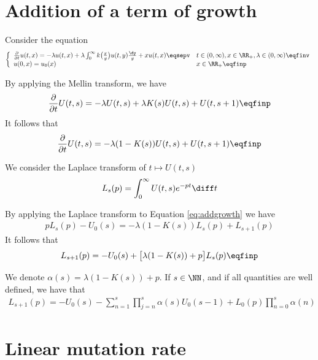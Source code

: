 \section{Addition of a term of growth}

Consider the equation
\begin{equation*}\left\{
    \begin{array}{ll}
	\frac{\partial}{\partial t}u(t,x) = - \lambda u(t,x) + \lambda \int_{0}^{\infty} k\big( \frac{x}{y}\big)u(t,y) \frac{\dy}{y} + xu(t,x)
	\eqsepv
	& t \in (0, \infty), x \in \RR_+, \lambda \in (0, \infty) \eqfinv
	\\
	u(0, x) = u_0(x)
	& x \in \RR_+
	\eqfinp
    \end{array}
	\right.
\end{equation*}

By applying the Mellin transform, we have
	\begin{equation*}
		\frac{\partial}{\partial t} U(t,s) = - \lambda U(t,s) + \lambda K(s) U(t,s) + U(t,s+1)
		\eqfinp
	\end{equation*}
It follows that
    \begin{equation}
        \frac{\partial}{\partial t} U(t,s) = - \lambda (1-K(s)) U(t,s) + U(t,s+1)
		\eqfinp
        \label{eq:addgrowth}
    \end{equation}

We consider the Laplace transform of $t \mapsto U(t,s)$
$$ L_s(p) = \int_0^\infty U(t,s)e^{-pt}\diff t$$ 

By applying the Laplace transform to Equation \eqref{eq:addgrowth} we have 
\begin{align*}
    pL_s(p) - U_0(s) = -  \lambda (1-K(s)) L_s(p) + L_{s+1}(p)
\end{align*}
It follows that 
\begin{align*}
    L_{s+1}(p) = - U_0(s) + \big[\lambda (1-K(s)) + p \big]L_s(p)
    \eqfinp
\end{align*}

\begin{remark}
We denote $\alpha(s) = \lambda (1-K(s)) + p$. If $s \in \NN$, and if all quantities are well defined, we have that
\begin{align*}
    L_{s+1}(p) = -U_0(s) -\sum_{n = 1}^{s} \prod_{j = n}^s \alpha(s)U_0(s-1) + L_0(p) \prod_{n = 0}^{s}\alpha(n)
\end{align*}
\end{remark}



\section{Linear mutation rate}

